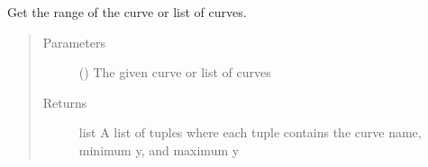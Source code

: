 \documentclass[letterpaper,10pt,english]{sphinxmanual}
\begin{document}
\begin{fulllineitems}
\label{\detokenize{pydv:pydvpy.getrange}}
Get the range of the curve or list of curves.

\begin{sphinxVerbatim}[commandchars=\\\{\}]
  
\end{sphinxVerbatim}

\begin{sphinxVerbatim}[commandchars=\\\{\}]
  
\end{sphinxVerbatim}

\begin{sphinxVerbatim}[commandchars=\\\{\}]
    \PYG{p}{[}\PYG{p}{]}
\end{sphinxVerbatim}
\begin{quote}\begin{description}
\item[{Parameters}] \leavevmode
{} ({\hyperref[\detokenize{pydv:curve.Curve}]{}}) \textendash{} The given curve or list of curves

\item[{Returns}] \leavevmode
list \textendash{} A list of tuples where each tuple contains the curve name, minimum y, and maximum y

\end{description}\end{quote}

\end{fulllineitems}

\end{document}
